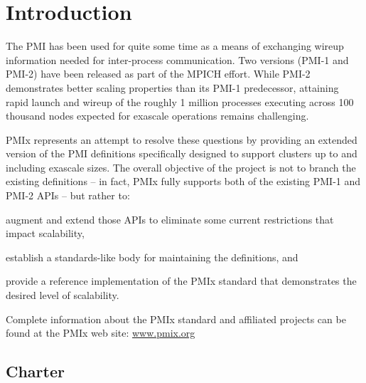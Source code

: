 \chapter{Introduction}
\label{chap:intro}

The \ac{PMI} has been used for quite some time as a means of exchanging wireup information needed for inter-process communication.
Two versions (PMI-1 and PMI-2) have been released as part of the MPICH effort.
While PMI-2 demonstrates better scaling properties than its PMI-1 predecessor, attaining rapid launch and wireup of the roughly 1 million processes executing across 100 thousand nodes expected for exascale operations remains challenging.

\ac{PMIx} represents an attempt to resolve these questions by providing an extended version of the \ac{PMI} definitions specifically designed to support clusters up to and including exascale sizes.
The overall objective of the project is not to branch the existing definitions -- in fact, PMIx fully supports both of the existing PMI-1 and PMI-2 APIs -- but rather to:

\begin{compactalphaenum}
\item augment and extend those APIs to eliminate some current restrictions that impact scalability,
\item establish a standards-like body for maintaining the definitions, and
\item provide a reference implementation of the PMIx standard that demonstrates the desired level of scalability.
\end{compactalphaenum}

Complete information about the \ac{PMIx} standard and affiliated projects can be found at the \ac{PMIx} web site: \url{www.pmix.org}


\section{Charter}
\label{chap:intro:charter}

